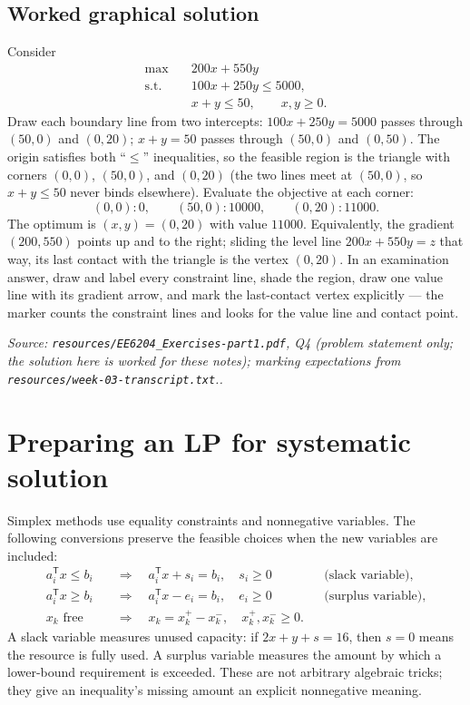 \documentclass[11pt,a4paper]{article}
\renewcommand{\texttt}[1]{\nolinkurl{#1}}
\newcommand{\T}{\mathsf{T}}
\newcommand{\source}[1]{\par\smallskip\noindent\textit{Source: #1.}\par\smallskip}
\begin{document}
\subsection{Worked graphical solution}
Consider
\[
\begin{aligned}
 \max\quad&200x+550y\\
 \text{s.t.}\quad&100x+250y\leq5000,\\
 &x+y\leq50,\qquad x,y\geq0.
\end{aligned}
\]
Draw each boundary line from two intercepts: $100x+250y=5000$ passes through $(50,0)$ and $(0,20)$; $x+y=50$ passes through $(50,0)$ and $(0,50)$. The origin satisfies both ``$\leq$'' inequalities, so the feasible region is the triangle with corners $(0,0)$, $(50,0)$, and $(0,20)$ (the two lines meet at $(50,0)$, so $x+y\leq50$ never binds elsewhere). Evaluate the objective at each corner:
\[
 (0,0)\!:0,\qquad (50,0)\!:10000,\qquad (0,20)\!:11000.
\]
The optimum is $(x,y)=(0,20)$ with value $11000$. Equivalently, the gradient $(200,550)$ points up and to the right; sliding the level line $200x+550y=z$ that way, its last contact with the triangle is the vertex $(0,20)$. In an examination answer, draw and label every constraint line, shade the region, draw one value line with its gradient arrow, and mark the last-contact vertex explicitly --- the marker counts the constraint lines and looks for the value line and contact point.
\source{\texttt{resources/EE6204\_Exercises-part1.pdf}, Q4 (problem statement only; the solution here is worked for these notes); marking expectations from \texttt{resources/week-03-transcript.txt}.}

\section{Preparing an LP for systematic solution}
Simplex methods use equality constraints and nonnegative variables. The following conversions preserve the feasible choices when the new variables are included:
\begin{align*}
 a_i^\T x\leq b_i&\quad\Longrightarrow\quad a_i^\T x+s_i=b_i,\quad s_i\geq0 &&\text{(slack variable)},\\
 a_i^\T x\geq b_i&\quad\Longrightarrow\quad a_i^\T x-e_i=b_i,\quad e_i\geq0 &&\text{(surplus variable)},\\
 x_k\text{ free}&\quad\Longrightarrow\quad x_k=x_k^+-x_k^-,\quad x_k^+,x_k^-\geq0.
\end{align*}
A slack variable measures unused capacity: if $2x+y+s=16$, then $s=0$ means the resource is fully used. A surplus variable measures the amount by which a lower-bound requirement is exceeded. These are not arbitrary algebraic tricks; they give an inequality's missing amount an explicit nonnegative meaning.
\end{document}
